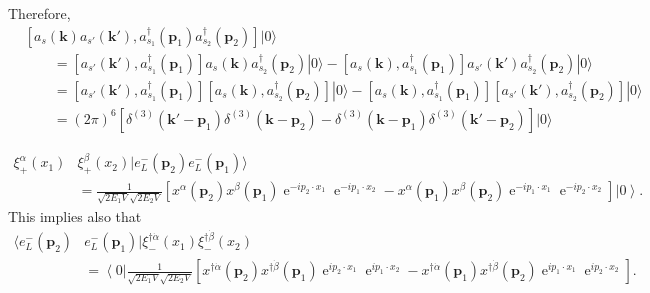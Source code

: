 Therefore,
\begin{align}
&\left[ a_s(\mathbf{k})a_{s'}(\mathbf{k}'),a_{s_1}^\dagger(\mathbf{p}_1)a_{s_2}^\dagger(\mathbf{p}_2)\right] |0\rangle \nonumber\\
&\qquad=\left[ a_{s'}(\mathbf{k}'),a_{s_1}^\dagger(\mathbf{p}_1)\right]a_s(\mathbf{k})a_{s_2}^\dagger(\mathbf{p}_2) |0\rangle
-
 \left[ a_s(\mathbf{k}),a_{s_1}^\dagger(\mathbf{p}_1)\right]a_{s'}(\mathbf{k}')a_{s_2}^\dagger(\mathbf{p}_2) |0\rangle \nonumber\\
&\qquad=\left[ a_{s'}(\mathbf{k}'),a_{s_1}^\dagger(\mathbf{p}_1)\right] \left[a_s(\mathbf{k}),a_{s_2}^\dagger(\mathbf{p}_2)  \right] |0\rangle-
  \left[ a_s(\mathbf{k}),a_{s_1}^\dagger(\mathbf{p}_1)\right] \left[ a_{s'}(\mathbf{k}'),a_{s_2}^\dagger(\mathbf{p}_2)  \right] |0\rangle \nonumber\\
&\qquad= (2\pi)^6 \left[ \delta^{(3)}(\mathbf{k}'-\mathbf{p}_1)\delta^{(3)}(\mathbf{k}-\mathbf{p}_2) 
    -\delta^{(3)}(\mathbf{k}-\mathbf{p}_1)\delta^{(3)}(\mathbf{k}'-\mathbf{p}_2) \right]|0\rangle
\end{align}


\begin{align}
\label{eq:belel}
  \xi^\alpha_+(x_1)&\xi^\beta_+(x_2)|e_L^-(\mathbf{p}_2)e_L^-(\mathbf{p}_1)\rangle
 \nonumber\\
&=\frac{1 }{\sqrt{2 E_1V}\sqrt{2 E_2V}} \left[ x^{\alpha}(\mathbf{p}_2)x^{\beta}(\mathbf{p}_1)
\operatorname{e}^{-i p_2\cdot x_1}\operatorname{e}^{-i p_1\cdot x_2}
- x^{\alpha}(\mathbf{p}_1)x^{\beta}(\mathbf{p}_2)
\operatorname{e}^{-i p_1\cdot x_1}\operatorname{e}^{-i p_2\cdot x_2}   \right] \left|0\right\rangle.
\end{align}
This implies also that
\begin{align}
\label{eq:kelel}
 \langle e_L^-(\mathbf{p}_2)&e_L^-(\mathbf{p}_1) |  \xi^{\dagger\dot{\alpha}}_-  (x_1)\xi^{\dagger\dot{\beta}}_-(x_2) \nonumber\\
&=\left\langle 0\right|\frac{1 }{\sqrt{2 E_1V}\sqrt{2 E_2V}}  \left[x^{\dagger\dot{\alpha}}(\mathbf{p}_2)x^{\dagger\dot{\beta}}(\mathbf{p}_1)
\operatorname{e}^{i p_2\cdot x_1}\operatorname{e}^{i p_1\cdot x_2}
- x^{\dagger\dot{\alpha}}(\mathbf{p}_1)x^{\dagger\dot{\beta}}(\mathbf{p}_2)
\operatorname{e}^{i p_1\cdot x_1}\operatorname{e}^{i p_2\cdot x_2}   \right] .
\end{align}

